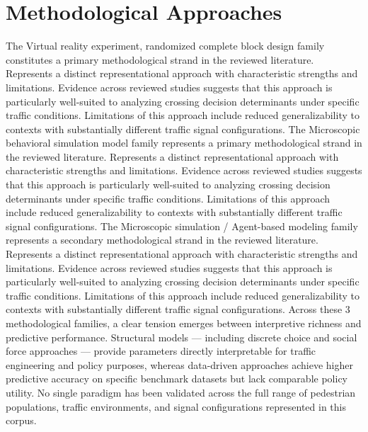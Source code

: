 \documentclass{article}
\begin{document}
\section{Methodological Approaches}
The Virtual reality experiment, randomized complete block design family constitutes a primary methodological strand in the reviewed literature. Represents a distinct representational approach with characteristic strengths and limitations. Evidence across reviewed studies suggests that this approach is particularly well-suited to analyzing crossing decision determinants under specific traffic conditions. Limitations of this approach include reduced generalizability to contexts with substantially different traffic signal configurations. The Microscopic behavioral simulation model family represents a primary methodological strand in the reviewed literature. Represents a distinct representational approach with characteristic strengths and limitations. Evidence across reviewed studies suggests that this approach is particularly well-suited to analyzing crossing decision determinants under specific traffic conditions. Limitations of this approach include reduced generalizability to contexts with substantially different traffic signal configurations. The Microscopic simulation / Agent-based modeling family represents a secondary methodological strand in the reviewed literature. Represents a distinct representational approach with characteristic strengths and limitations. Evidence across reviewed studies suggests that this approach is particularly well-suited to analyzing crossing decision determinants under specific traffic conditions. Limitations of this approach include reduced generalizability to contexts with substantially different traffic signal configurations. Across these 3 methodological families, a clear tension emerges between interpretive richness and predictive performance. Structural models — including discrete choice and social force approaches — provide parameters directly interpretable for traffic engineering and policy purposes, whereas data-driven approaches achieve higher predictive accuracy on specific benchmark datasets but lack comparable policy utility. No single paradigm has been validated across the full range of pedestrian populations, traffic environments, and signal configurations represented in this corpus.
\end{document}
